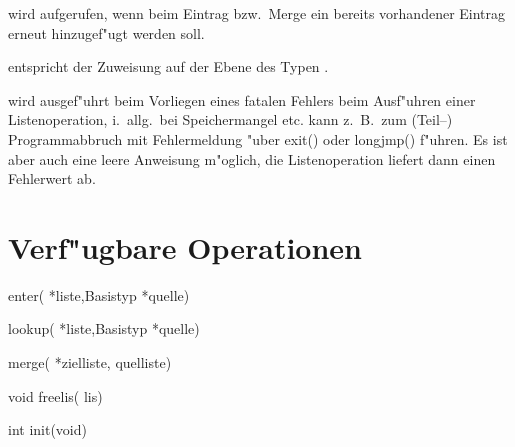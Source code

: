  wird aufgerufen, wenn beim Eintrag bzw.\ Merge ein bereits
vorhandener Eintrag erneut hinzugef"ugt werden soll.

 entspricht der Zuweisung auf der Ebene des Typen .

 wird ausgef"uhrt beim Vorliegen eines fatalen Fehlers beim
Ausf"uhren einer Listenoperation, i.\ allg.\ bei Speichermangel etc.
 kann z.\ B.\ zum (Teil--) Programmabbruch mit Fehlermeldung 
"uber exit() oder longjmp() f"uhren. Es ist aber auch eine leere Anweisung
m"oglich, die Listenoperation liefert dann einen Fehlerwert ab.


\section{Verf"ugbare Operationen}

 enter( *liste,Basistyp *quelle)

 lookup( *liste,Basistyp *quelle)

 merge( *zielliste, quelliste)

void freelis( lis)

int init(void)



